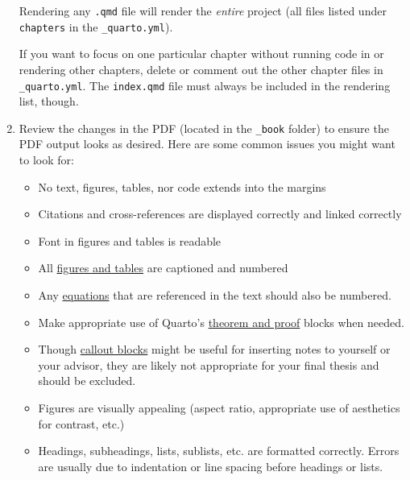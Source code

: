\documentclass[
  11pt,
  letterpaper,
  twoside]{report}
\begin{document}
\begin{enumerate}
  \begin{tcolorbox}[enhanced jigsaw, coltitle=black, leftrule=.75mm, rightrule=.15mm, breakable, titlerule=0mm, bottomrule=.15mm, left=2mm, colbacktitle=quarto-callout-note-color!10!white, arc=.35mm, toprule=.15mm, title=\textcolor{quarto-callout-note-color}{\faInfo}\hspace{0.5em}{Note}, toptitle=1mm, colback=white, bottomtitle=1mm, opacitybacktitle=0.6, opacityback=0, colframe=quarto-callout-note-color-frame]

  Rendering any \texttt{.qmd} file will render the \emph{entire} project
  (all files listed under \texttt{chapters} in the
  \texttt{\_quarto.yml}).

  If you want to focus on one particular chapter without running code in
  or rendering other chapters, delete or comment out the other chapter
  files in \texttt{\_quarto.yml}. The \texttt{index.qmd} file must
  always be included in the rendering list, though.

  \end{tcolorbox}
\item
  Review the changes in the PDF (located in the \texttt{\_book} folder)
  to ensure the PDF output looks as desired. Here are some common issues
  you might want to look for:

  \begin{itemize}
  \item
    No text, figures, tables, nor code extends into the margins
  \item
    Citations and cross-references are displayed correctly and linked
    correctly
  \item
    Font in figures and tables is readable
  \item
    All
    \href{https://quarto.org/docs/authoring/cross-references.html\#floats}{figures
    and tables} are captioned and numbered
  \item
    Any
    \href{https://quarto.org/docs/authoring/cross-references.html\#equations}{equations}
    that are referenced in the text should also be numbered.
  \item
    Make appropriate use of Quarto's
    \href{https://quarto.org/docs/authoring/cross-references.html\#theorems-and-proofs}{theorem
    and proof} blocks when needed.
  \item
    Though
    \href{https://quarto.org/docs/authoring/callouts.html}{callout
    blocks} might be useful for inserting notes to yourself or your
    advisor, they are likely not appropriate for your final thesis and
    should be excluded.
  \item
    Figures are visually appealing (aspect ratio, appropriate use of
    aesthetics for contrast, etc.)
  \item
    Headings, subheadings, lists, sublists, etc. are formatted
    correctly. Errors are usually due to indentation or line spacing
    before headings or lists.


\end{itemize}
\end{enumerate}
\end{document}
